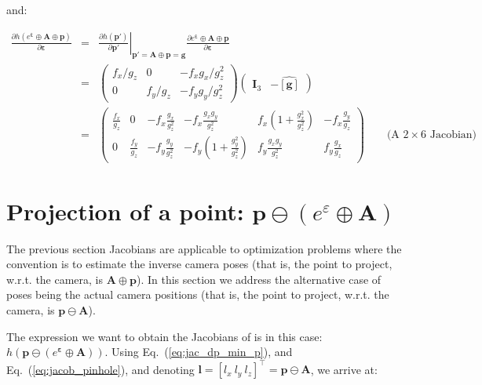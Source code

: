 \documentclass[a4paper,11pt]{report}
\newcommand{\E}{{\bm{\varepsilon}}}
\newcommand{\A}{{\mathbf{A}}}
\begin{document}
\noindent and:

\begin{eqnarray}
\frac{\partial h(e^\E \oplus \A \oplus \mathbf{p})}{\partial \mathbf{\E}}
&=&
\left. \frac{\partial h(\mathbf{p'})}{\partial \mathbf{p'}} \right|_{ \mathbf{p'} = \A \oplus \mathbf{p} = \mathbf{g} }
\frac{\partial e^\E \oplus \A \oplus \mathbf{p} }{\partial \E} \\
&=&
\left(
\begin{array}{ccc}
 f_x / g_z   &    0    &  -f_x g_x / g_z^2   \\
 0 & f_y / g_z  &  -f_y g_y / g_z^2
\end{array}
\right)
\left(
\begin{array}{cc}
 \mathbf{I}_3   & - \widehat{\left[ \mathbf{g} \right]}
\end{array}
\right) \\
&=&
\left(
\begin{array}{cccccc}
 \frac{f_x}{g_z}  &
 0 &
 -f_x\frac{g_x}{g_z^2} &
 -f_x \frac{g_x g_y}{g_z^2} &
  f_x  (1 + \frac{g_x^2}{g_z^2} )  &
 -f_x \frac{g_y}{g_z}
\\
 0 &
 \frac{f_y}{g_z}  &
 -f_y\frac{g_y}{g_z^2}
 &
  -f_y (1 + \frac{g_y^2}{g_z^2}) &
  f_y \frac{g_x g_y}{g_z^2} &
  f_y \frac{g_x}{g_z}
\end{array}
\right)
\quad\quad \text{(A $2 \times 6$ Jacobian)} \nonumber
\end{eqnarray}



\newpage

\section{Projection of a point: $\mathbf{p} \ominus (e^\varepsilon \oplus \mathbf{A})$}

The previous section Jacobians are applicable to optimization problems
where the convention is to estimate the inverse camera poses
(that is, the point to project, w.r.t. the camera, is $\A \oplus \mathbf{p}$).
In this section we address the alternative case of poses being the actual
camera positions
(that is, the point to project, w.r.t. the camera, is $\mathbf{p} \ominus \A$).

The expression we want to obtain the Jacobians of is in this case:
$h(\mathbf{p} \ominus (e^\E \oplus \A))$.
Using Eq.~(\ref{eq:jac_dp_min_p}),
and  Eq.~(\ref{eq:jacob_pinhole}),
and denoting $\mathbf{l}=[l_x ~ l_y ~ l_z]^\top=\mathbf{p} \ominus \A$,
we arrive at:
\end{document}
